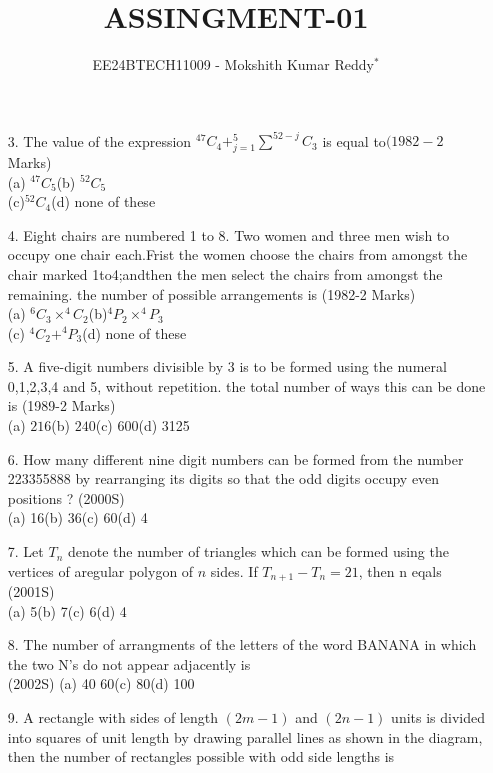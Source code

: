 \documentclass[journal,12pt,twocolumn]{IEEEtran}
\theoremstyle{remark}
\begin{document}

\vspace{3cm}

\title{ASSINGMENT-01}
\author{EE24BTECH11009 - Mokshith Kumar Reddy$^{*}$%
}
\maketitle
\newpage
\bigskip
\begin{enumerate}
\item[3.] The value of the expression $^{47}C_4 + ^5_{j=1}\sum ^{52-j}C_3$ is equal to\hfill{$(1982-2$ Marks)}\\
(a) $^{47}C_5$\quad\quad(b) $^{52}C_5$\\
(c)$^{52}C_4$\quad\quad(d) none of these\\
\item[4.]Eight chairs are numbered 1 to 8. Two women and three men wish to occupy one chair each.Frist the women choose the chairs from amongst the chair marked 1to4;andthen the men select the chairs from amongst the remaining. the number of possible arrangements is
\hfill{(1982-2 Marks)}\\
(a) $^6C_3\times^4C_2$\quad\quad(b)$^4P_2\times^4P_3$\\
(c) $^4C_2+^4P_3$\quad\quad(d) none of these\\[4pt]
\item[5.]A five-digit numbers divisible by 3 is to be formed using the numeral 0,1,2,3,4 and 5, without repetition. the total number of ways this can be done is
\hfill{(1989-2 Marks)}\\
(a) $216$\quad(b) $240$\quad(c) 600\quad(d) 3125\\[4pt]
\item[6.]How many different nine digit numbers can be formed from the number 223355888 by rearranging its digits so that the odd digits occupy even positions ?
\hfill{(2000S)}\\
(a) 16\quad(b) 36\quad(c) 60\quad(d) 4
\item[7.]Let $T_n$ denote the number of triangles which can be formed using the vertices of aregular polygon of $n$ sides. If $T_{n+1}-T_n=21$, then n eqals
\hfill{(2001S)}\\
(a) 5\quad(b) 7\quad(c) 6\quad(d) 4
\item[8.]The number of arrangments of the letters of the word BANANA in which the two N's do not appear adjacently is\\
\hfill{(2002S)}
(a) 40\quad{} 60\quad(c) 80\quad(d) 100
\item[9.]A rectangle with sides of length $(2m-1)$ and $(2n-1)$ units is divided into squares of unit length by drawing parallel lines as shown in the diagram, then the number of rectangles possible with odd side lengths is

\end{enumerate}
\end{document}
